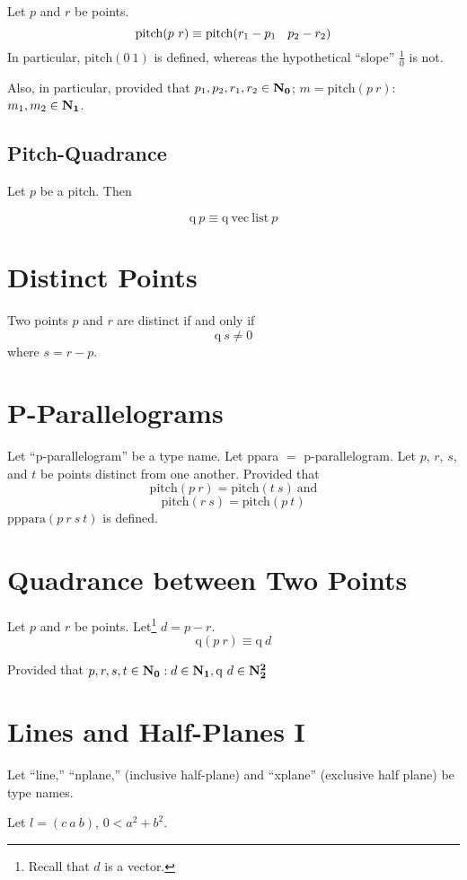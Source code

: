 \documentclass{article}
\begin{document}
Let $p$ and $r$ be points.
$$\mathrm{pitch}(p\ r)\equiv \mathrm{pitch}(r_1-p_1\en p_2-r_2)$$
In particular, $\mathrm{pitch}(0\ 1)$ is defined, whereas the hypothetical ``slope'' $\frac{1}{0}$ is not.

Also, in particular,
provided that $p_1, p_2, r_1, r_2\in \mathbf{N_0}$;
$m=\mathrm{pitch}(p\ r)$:
$m_1, m_2\in \mathbf{N_1}$.

\subsection{Pitch-Quadrance}

Let $p$ be a pitch. Then

$$\mathrm{q}\ p\equiv \mathrm{q\ vec\ list}\ p$$

\section{Distinct Points}

Two points $p$ and $r$ are distinct if and only if
$$\mathrm{q}\ s\ne 0$$
where $s=r-p$.

\section{P-Parallelograms}

Let ``p-parallelogram'' be a type name.
Let ppara $=$ p-parallelogram.
Let $p$, $r$, $s$, and $t$ be points distinct from one another.
Provided that
$$\mathrm{pitch}(p\ r) = \mathrm{pitch}(t\ s)\ \mathrm{and}$$
$$\mathrm{pitch}(r\ s) = \mathrm{pitch}(p\ t)$$
$\mathrm{pppara}(p\ r\ s\ t)$ is defined.

\section{Quadrance between Two Points}

Let $p$ and $r$ be points. Let\footnote{Recall that $d$ is a vector.} $d = p - r$.
$$\mathrm{q} (p\ r) \equiv \mathrm{q}\ d$$

Provided that $p, r, s, t\in \mathbf{N_0}: d\in\mathbf{N_1}, \mathrm{q}\ d\in\mathbf{N_2^2}$

\section{Lines and Half-Planes I}

Let ``line,'' ``nplane,'' (inclusive half-plane) and ``xplane'' (exclusive half plane) be type names.

Let $l=(c\ a\ b)$, $0<a^2+b^2$.
\end{document}
